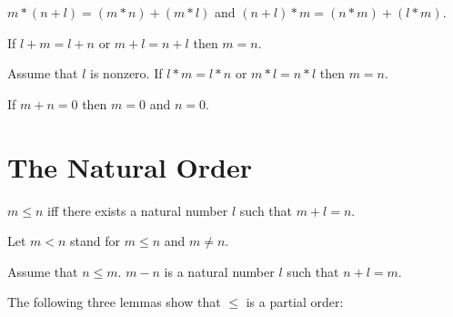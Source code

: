 \documentclass[11pt]{article}
\begin{document}
\begin{forthel}
\begin{axiom} $m * (n + l) = (m * n) + (m * l)$ and
                $(n + l) * m = (n * m) + (l * m)$.
\end{axiom}

\begin{axiom} If $l + m = l + n$ or $m + l = n + l$ 
then $m = n$.
\end{axiom}

\begin{axiom} Assume that $l$ is nonzero.
If $l * m = l * n$ or $m * l = n * l$ then $m = n$.
\end{axiom}

\begin{axiom} If $m + n = 0$ then $m = 0$ and $n = 0$.
\end{axiom}

\end{forthel}

\section{The Natural Order}

\begin{forthel}

\begin{definition} $m \leq n$ iff 
there exists a natural number $l$ such that  
$m + l = n$.
\end{definition}

Let $m < n$ stand for $m \leq n$ and $m \neq n$.

\begin{definition} Assume that $n \leq m$.
$m - n$ is a natural number $l$ such that $n + l  = m$.
\end{definition}

\end{forthel}

The following three lemmas show that $\leq$ is a partial order:
\end{document}
